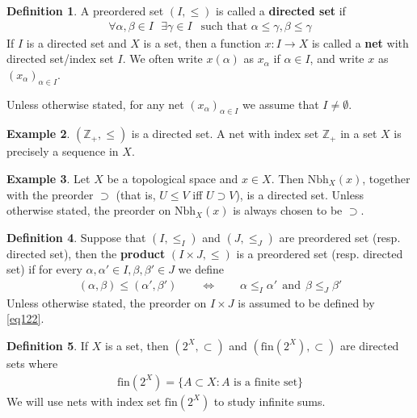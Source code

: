 \documentclass[12pt,b5paper,notitlepage]{article}
\theoremstyle{definition}
\newtheorem{df}{Definition}[section]
\newtheorem{eg}[df]{Example}
\theoremstyle{plain}
\newcommand{\Zbb}{\mathbb Z}
\newcommand{\fin}{\mathrm{fin}}
\newcommand{\Nbh}{\mathrm{Nbh}}
\newcommand{\hqed}{\hfill\qedsymbol}
\numberwithin{equation}{section}
\begin{document}
\begin{df}
A preordered set $(I,\leq)$ is called a \textbf{directed set}  if 
\begin{align}
\forall\alpha,\beta\in I~~~\exists\gamma\in I~~\text{ such that }\alpha\leq \gamma,\beta\leq\gamma  \label{eq123}
\end{align}
If $I$ is a directed set and $X$ is a set, then a function $x:I\rightarrow X$ is called a \textbf{net}  with directed set/index set $I$. We often write $x(\alpha)$ as $x_\alpha$ if $\alpha\in I$, and write $x$ as $(x_\alpha)_{\alpha\in I}$.

Unless otherwise stated, for any net $(x_\alpha)_{\alpha\in I}$ we assume that $I\neq\emptyset$.  \hqed
\end{df}


\begin{eg}
$(\Zbb_+,\leq)$ is a directed set. A net with index set $\Zbb_+$ in a set $X$ is precisely a sequence in $X$.
\end{eg}


\begin{eg}
Let $X$ be a topological space and $x\in X$. Then $\Nbh_X(x)$, together with the preorder $\supset$ (that is, $U\leq V$ iff $U\supset V$), is a directed set. Unless otherwise stated, the preorder on $\Nbh_X(x)$ is always chosen to be $\supset$.
\end{eg}

\begin{df}\label{lb207}
Suppose that $(I,\leq_I )$ and $(J,\leq_J)$ are preordered set (resp. directed set), then the \textbf{product}  $(I\times J,\leq)$ is a preordered set (resp. directed set) if for every $\alpha,\alpha'\in I,\beta,\beta'\in J$ we define
\begin{align}\label{eq122}
(\alpha,\beta)\leq (\alpha',\beta')\qquad\Longleftrightarrow\qquad \alpha\leq_I \alpha'~~\text{and}~~\beta\leq_J\beta'
\end{align}
Unless otherwise stated, the preorder on $I\times J$ is assumed to be defined by \eqref{eq122}.
\end{df}


\begin{df}
If $X$ is a set, then $(2^X,\subset)$ and $(\fin(2^X),\subset)$ \index{fin@$\fin(2^X)$} are directed sets where
\begin{align}
\fin(2^X)=\{A\subset X:A\text{ is a finite set}\}
\end{align}
We will use nets with index set $\fin(2^X)$ to study infinite sums.
\end{df}
\end{document}

